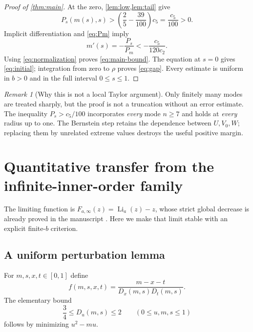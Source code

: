 \documentclass[11pt,letterpaper]{article}
\numberwithin{equation}{section}
\theoremstyle{definition}
\theoremstyle{remark}
\newtheorem{remark}[theorem]{Remark}
\DeclareMathOperator{\Li}{Li}
\begin{document}
\begin{proof}[Proof of \cref{thm:main}]
At the zero, \cref{lem:low,lem:tail} give
\begin{equation}\label{eq:Ps-gap}
 P_s(m(s),s)>\left(\frac25-\frac{39}{100}\right)c_5
 =\frac{c_5}{100}>0.
\end{equation}
Implicit differentiation and \eqref{eq:Pm} imply
\[
 m'(s)=-\frac{P_s}{P_m}
 <-\frac{c_5}{120c_2}.
\]
Using \eqref{eq:normalization} proves \eqref{eq:main-bound}.
The equation at $s=0$ gives \eqref{eq:initial}; integration from zero
to $\rho$ proves \eqref{eq:gap}. Every estimate is uniform in $b>0$ and
in the full interval $0\le s\le1$.
\end{proof}

\begin{remark}[Why this is not a local Taylor argument]
Only finitely many modes are treated sharply, but the proof is not a
truncation without an error estimate. The inequality
$P_s>c_5/100$ incorporates \emph{every} mode $n\ge7$ and holds at
\emph{every} radius up to one. The Bernstein step retains the dependence
between $U,V_0,W$; replacing them by unrelated extreme values destroys
the useful positive margin.
\end{remark}

\section{Quantitative transfer from the infinite-inner-order family}
\label{sec:stability}
The limiting function is
$F_{a,\infty}(z)=\Li_a(z)-z$, whose strict global decrease is already
proved in the manuscript \cite{repo-cartesian}. Here we make that
limit stable with an explicit finite-$b$ criterion.

\subsection{A uniform perturbation lemma}
For $m,s,x,t\in[0,1]$ define
\begin{equation}\label{eq:f}
 f(m,s,x,t)=\frac{m-x-t}{D_x(m,s)D_t(m,s)}.
\end{equation}
The elementary bound
\begin{equation}\label{eq:D-bounds}
 \frac34\le D_u(m,s)\le2\qquad(0\le u,m,s\le1)
\end{equation}
follows by minimizing $u^2-mu$.
\end{document}
